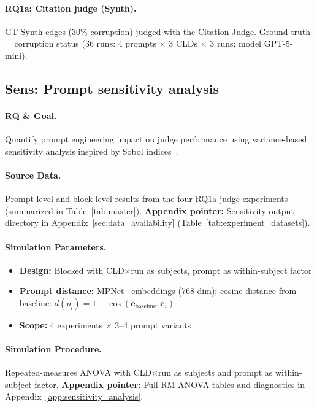 \paragraph{RQ1a: Citation judge (Synth).}\label{sec:rq1a_citation_synth}
GT Synth edges (30\% corruption) judged with the Citation Judge. Ground truth = corruption status (36 runs: 4 prompts $\times$ 3 CLDs $\times$ 3 runs; model GPT-5-mini).

\subsection{Sens: Prompt sensitivity analysis}
\label{sec:rq1a_sensitivity}

\paragraph{RQ \& Goal.}
Quantify prompt engineering impact on judge performance using variance-based sensitivity analysis inspired by Sobol indices~\cite{sobol1993sensitivity}.

\paragraph{Source Data.}
Prompt-level and block-level results from the four RQ1a judge experiments (summarized in Table~\ref{tab:master}).
\textbf{Appendix pointer:} Sensitivity output directory in Appendix~\ref{sec:data_availability} (Table~\ref{tab:experiment_datasets}).

\paragraph{Simulation Parameters.}
\begin{itemize}[noitemsep]
    \item \textbf{Design:} Blocked with CLD$\times$run as subjects, prompt as within-subject factor
    \item \textbf{Prompt distance:} MPNet~\cite{song2020mpnet} embeddings (768-dim); cosine distance from baseline: $d(p_i) = 1 - \cos(\mathbf{e}_{\text{baseline}}, \mathbf{e}_i)$
    \item \textbf{Scope:} 4 experiments $\times$ 3--4 prompt variants
\end{itemize}

\paragraph{Simulation Procedure.}
Repeated-measures ANOVA with CLD$\times$run as subjects and prompt as within-subject factor.
\textbf{Appendix pointer:} Full RM-ANOVA tables and diagnostics in Appendix~\ref{app:sensitivity_analysis}.

